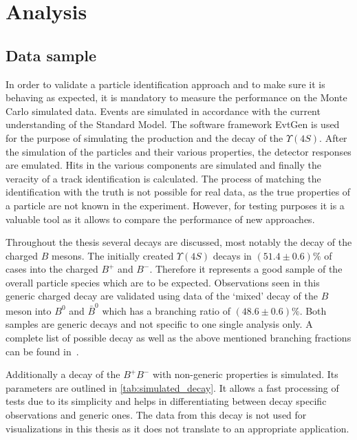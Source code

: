 \chapter{Analysis}
\label{chap:analysis}

\section{Data sample}
\label{sec:data_sample}

In order to validate a particle identification approach and to make sure it is behaving as expected, it is mandatory to measure the performance on the Monte Carlo simulated data. Events are simulated in accordance with the current understanding of the Standard Model. The software framework EvtGen is used for the purpose of simulating the production and the decay of the $\Upsilon(4S)$. After the simulation of the particles and their various properties, the detector responses are emulated. Hits in the various components are simulated and finally the veracity of a track identification is calculated. The process of matching the identification with the truth is not possible for real data, as the true properties of a particle are not known in the experiment. However, for testing purposes it is a valuable tool as it allows to compare the performance of new approaches.

Throughout the thesis several decays are discussed, most notably the decay of the charged $B$ mesons. The initially created $\Upsilon(4S)$ decays in $(51.4 \pm 0.6) \%$ of cases into the charged $B^+$ and $B^-$. Therefore it represents a good sample of the overall particle species which are to be expected. Observations seen in this generic charged decay are validated using data of the `mixed' decay of the $B$ meson into $B^0$ and $\bar{B}^0$ which has a branching ratio of $(48.6 \pm 0.6) \%$. Both samples are generic decays and not specific to one single analysis only. A complete list of possible decay as well as the above mentioned branching fractions can be found in~\cite{Patrignani:2016xqp}.

Additionally a decay of the $B^+ B^-$ with non-generic properties is simulated. Its parameters are outlined in \autoref{tab:simulated_decay}. It allows a fast processing of tests due to its simplicity and helps in differentiating between decay specific observations and generic ones. The data from this decay is not used for visualizations in this thesis as it does not translate to an appropriate application.

